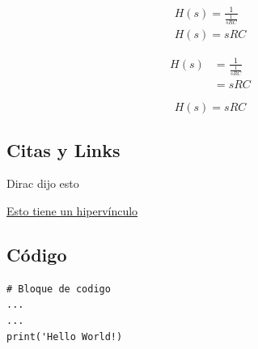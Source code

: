 \begin{equation}
    \begin{gathered}
        H(s) = \frac{1}{\frac{1}{sRC}} \\
        H(s)= sRC
    \end{gathered}
\end{equation}

\begin{equation}
    \begin{split}
        H(s) &= \frac{1}{\frac{1}{sRC}} \\
             &= sRC
    \end{split}
\end{equation}



\[H(s)= sRC\]




\subsection{Citas y Links}

Dirac dijo esto~\cite{dirac}

\href{http://www.overleaf.com}{Esto tiene un hipervínculo}


\subsection{Código}
\begin{lstlisting}
# Bloque de codigo
...
...
print('Hello World!)
\end{lstlisting}


